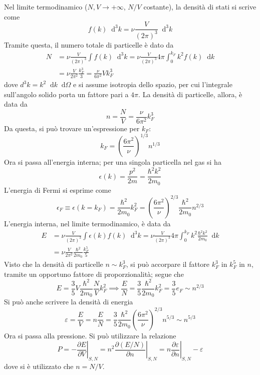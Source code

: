 \documentclass[11pt, a4paper]{scrartcl}
\theoremstyle{style}
\newcommand{\dd}{\mathop{}\!\mathrm{d}}
\newcommand*\Eval[3]{\left.#1\right\rvert_{#2}^{#3}}
\numberwithin{equation}{subsection}
\begin{document}
Nel limite termodinamico ($N,V\to +\infty$, $N/V$ costante), la densit\`a di stati si scrive come
\[
	f(k) \dd ^3k = \nu  \frac{V}{(2\pi)^3}\dd ^3 k
\] 
Tramite questa, il numero totale di particelle \`e dato da 
\[
	\begin{split}
		N &= \nu  \frac{V}{(2\pi)^3} \int f(k) \dd ^3 k = \nu  \frac{V}{(2\pi)^3} 4\pi \int_0^{k_F} k^2 f(k) \dd k\\
		  &= \nu  \frac{V}{2\pi^2} \frac{k_F^3}{3} = \frac{\nu }{6 \pi ^2} V k_F^3
	\end{split}
\] 
dove $d^3 k = k^2 \dd k \dd \Omega $ e si assume isotropia dello spazio, per cui l'integrale sull'angolo solido porta un fattore pari a $4\pi$.   
La densit\`a di particelle, allora, \`e data da 
\[
n = \frac{N}{V} = \frac{\nu }{6 \pi ^2} k_F^3
\] 
Da questa, si pu\`o trovare un'espressione per $k_F$:
\[
k_F = \left(\frac{6\pi^2}{\nu }\right) ^{1 / 3} n ^{1 / 3}
\] 
Ora si passa all'energia interna; per una singola particella nel gas si ha	
\[
\epsilon (k) = \frac{p^2}{2m}=\frac{\hbar^2 k^2}{2m_0}
\] 
L'energia di Fermi si esprime come
\[
\epsilon _F \equiv \epsilon (k = k_F) = \frac{\hbar ^2}{2m_0} k_F^2 = \left(\frac{6 \pi ^2}{\nu }\right) ^{2 / 3} \frac{\hbar ^2}{2m_0} n^{2 / 3}
\] 
L'energia interna, nel limite termodinamico, \`e data da 
\[
	\begin{split}
		E &= \nu  \frac{V}{(2\pi)^3} \int \epsilon (k) f(k) \dd ^3 k =\nu  \frac{V}{(2\pi)^3} 4\pi \int_0^{k_F} k^2 \frac{\hbar ^2 k^2}{2m_0} \dd k\\
		  &= \nu  \frac{V}{2\pi^2} \frac{\hbar ^2}{2m_0} \frac{k_F^5}{5}
	\end{split}
\] 
Visto che la densit\`a di particelle $n \sim k_F^3$, si pu\`o accorpare il fattore $k_F^3$ in $k_F^5$ in $n$, tramite un opportuno fattore di proporzionalit\`a; segue che
\begin{equation}
	E = \frac{3}{5} V \frac{\hbar ^2}{2m_0} \frac{N}{V}k_F^2 \implies \frac{E}{N} = \frac{3}{5} \frac{\hbar ^2}{2m_0}k_F^2 = \frac{3}{5}e_F \sim n^{2 / 3}
\end{equation}
Si pu\`o anche scrivere la densit\`a di energia
\[
\varepsilon = \frac{E}{V} = n \frac{E}{N} = \frac{3}{5} \frac{\hbar ^2}{2m_0} \left(\frac{6\pi^2}{\nu }\right) ^{2 / 3} n^{5 / 3} \sim n^{5 / 3}
\] 
Ora si passa alla pressione.
Si pu\`o utilizzare la relazione
\[
	P = \Eval{-\frac{\partial E}{\partial V}}{S,N}{} = \Eval{n^2 \frac{\partial (E / N)}{\partial n} }{S , N }{} = \Eval{n \frac{\partial \varepsilon }{\partial n} }{S , N }{} - \varepsilon 
\] 
dove si \`e utilizzato che $n = N / V$.
\end{document}
